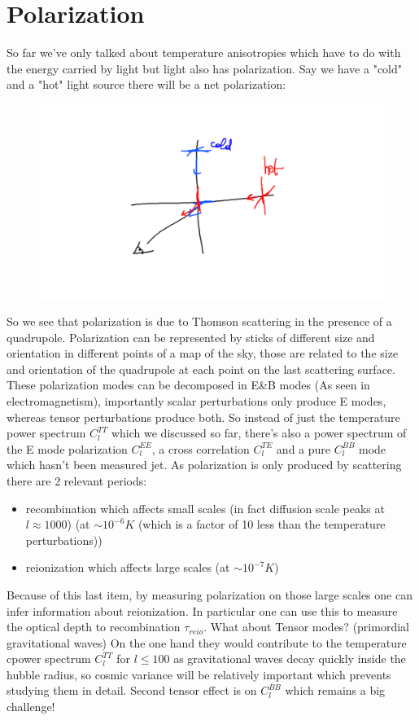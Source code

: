 \documentclass{article}
\begin{document}
\section{Polarization}
So far we've only talked about temperature anisotropies which have to do with the energy carried by light but light also has polarization. Say we have a "cold" and a "hot" light source there will be a net polarization:
\begin{figure}[h]
  \centering
  \includegraphics[scale=0.7]{polarization.png}
\end{figure}
So we see that polarization is due to Thomson scattering in the presence of a quadrupole.
Polarization can be represented by sticks of different size and orientation in different points of a map of the sky, those are related to the size and orientation of the quadrupole at each point on the last scattering surface.\\
These polarization modes can be decomposed in E\&B modes (As seen in electromagnetism), importantly scalar perturbations only produce E modes, whereas tensor perturbations produce both. So instead of just the temperature power spectrum $C_l^{TT}$ which we discussed so far, there's also a power spectrum of the E mode polarization $C_l^{EE}$, a cross correlation $C_l^{TE}$ and a pure $C_l^{BB}$ mode which hasn't been measured jet. As polarization is only produced by scattering there are 2 relevant periods:
\begin{itemize}
  \item recombination which affects small scales (in fact diffusion scale peaks at $l\approx 1000$) (at $\sim 10^{-6} K$ (which is a factor of 10 less than the temperature perturbations))
  \item reionization which affects large scales (at $\sim 10^{-7} K$)
\end{itemize}
Because of this last item, by measuring polarization on those large scales one can infer information about reionization. In particular one can use this to measure the optical depth to recombination $\tau_{reio}$.
What about Tensor modes? (primordial gravitational waves) On the one hand they would contribute to the temperature cpower spectrum $C_l^{TT}$ for $l\leq 100$ as gravitational waves decay quickly inside the hubble radius, so cosmic variance will be relatively important which prevents studying them in detail. Second tensor effect is on $C_l^{BB}$ which remains a big challenge!
\end{document}
